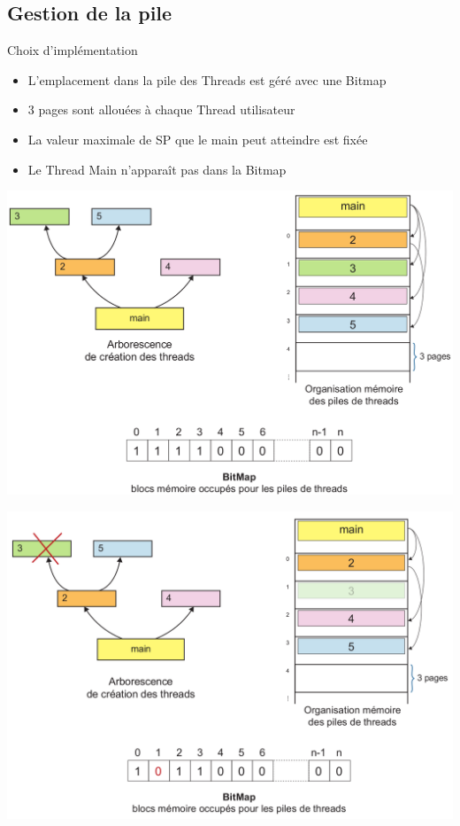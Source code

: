 \documentclass{beamer}
\begin{document}
\subsection{Gestion de la pile}
\begin{frame}
	\begin{block}{Choix d’implémentation }
		\begin{itemize}
			\item L'emplacement dans la pile des Threads est géré avec une Bitmap
			\item 3 pages sont allouées à chaque Thread utilisateur 
			\item La valeur maximale de SP que le main peut atteindre est fixée 
			\item Le Thread Main n’apparaît pas dans la Bitmap
		\end{itemize}
	\end{block}
\end{frame}

\begin{frame}
  	\begin{center}
	  	\includegraphics[scale=0.23]{images/FS3.png}
  	\end{center}
\end{frame}

\begin{frame}
  	\begin{center}
	  	\includegraphics[scale=0.23]{images/FS4.png}
  	\end{center}
\end{frame}
\end{document}

